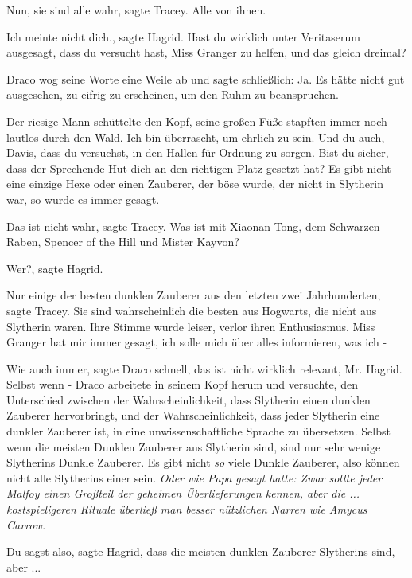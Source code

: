 \glqq{}Nun, sie sind alle wahr\grqq{}, sagte Tracey. \glqq{}Alle von ihnen.\grqq{}

\glqq{}Ich meinte nicht dich.\grqq{}, sagte Hagrid. \glqq{}Hast du wirklich unter
Veritaserum ausgesagt, dass du versucht hast, Miss Granger zu helfen, und
das gleich dreimal?\grqq{}

Draco wog seine Worte eine Weile ab und sagte schließlich: \glqq{}Ja.\grqq{} Es
hätte nicht gut ausgesehen, zu eifrig zu erscheinen, um den Ruhm zu
beanspruchen.

Der riesige Mann schüttelte den Kopf, seine großen Füße stapften immer noch
lautlos durch den Wald. \glqq{}Ich bin überrascht, um ehrlich zu sein. Und
du auch, Davis, dass du versuchst, in den Hallen für Ordnung zu sorgen.
Bist du sicher, dass der Sprechende Hut dich an den richtigen Platz
gesetzt hat? Es gibt nicht eine einzige Hexe oder einen Zauberer, der
böse wurde, der nicht in Slytherin war, so wurde es immer gesagt.\grqq{}

\glqq{}Das ist nicht wahr\grqq{}, sagte Tracey. \glqq{}Was ist mit Xiaonan Tong,
dem Schwarzen Raben, Spencer of the Hill und Mister Kayvon?\grqq{}

\glqq{}Wer?\grqq{}, sagte Hagrid.

\glqq{}Nur einige der besten dunklen Zauberer aus den letzten zwei
Jahrhunderten\grqq{}, sagte Tracey. \glqq{}Sie sind wahrscheinlich die
besten aus Hogwarts, die nicht aus Slytherin waren.\grqq{} Ihre Stimme
wurde leiser, verlor ihren Enthusiasmus. \glqq{}Miss Granger hat mir immer
gesagt, ich solle mich über alles informieren, was ich -\grqq{}

\glqq{}Wie auch immer\grqq{}, sagte Draco schnell, \glqq{}das ist nicht wirklich
relevant, Mr. Hagrid. Selbst wenn -\grqq{} Draco arbeitete in seinem Kopf
herum und versuchte, den Unterschied zwischen der Wahrscheinlichkeit,
dass Slytherin einen dunklen Zauberer hervorbringt, und der
Wahrscheinlichkeit, dass jeder Slytherin eine dunkler Zauberer ist, in
eine unwissenschaftliche Sprache zu übersetzen. \glqq{}Selbst wenn die
meisten Dunklen Zauberer aus Slytherin sind, sind nur sehr wenige
Slytherins Dunkle Zauberer. Es gibt nicht \emph{so} viele Dunkle
Zauberer, also können nicht alle Slytherins einer sein.\grqq{} \emph{Oder
wie Papa gesagt hatte: Zwar sollte jeder Malfoy einen Großteil der
geheimen Überlieferungen kennen, aber die ... kostspieligeren Rituale
überließ man besser nützlichen Narren wie Amycus Carrow.}

\glqq{}Du sagst also\grqq{}, sagte Hagrid, \glqq{}dass die meisten dunklen
Zauberer Slytherins sind, aber ...\grqq{}

